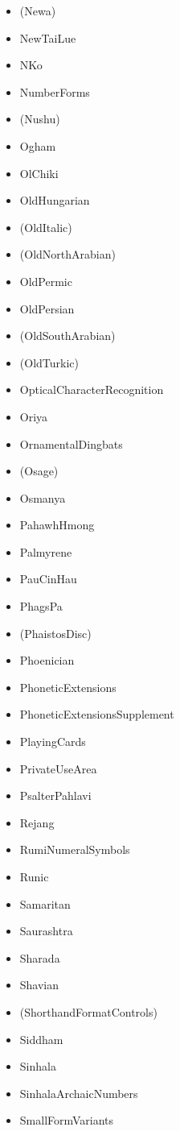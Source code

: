 \documentclass{article}
\newenvironment{itemlist}{%
  \begin{itemize}
	\setlength{\itemsep}{0pt}
	\setlength{\parsep}{0pt}
	\setlength{\topsep}{0pt}
	\setlength{\partopsep}{0pt}
	\setlength{\parskip}{0pt}
	\setlength{\labelsep}{5pt}}%
{
  \end{itemize}}
\begin{document}
\begin{multicols*}{2}
\begin{itemlist}
				\item (Newa)
				\item NewTaiLue
				\item NKo
				\item NumberForms
				\item (Nushu)
				\item Ogham
				\item OlChiki
				\item OldHungarian
				\item (OldItalic)
				\item (OldNorthArabian)
				\item OldPermic
				\item OldPersian
				\item (OldSouthArabian)
				\item (OldTurkic)
				\item OpticalCharacterRecognition
				\item Oriya
				\item OrnamentalDingbats
				\item (Osage)
				\item Osmanya
				\item PahawhHmong
				\item Palmyrene
				\item PauCinHau
				\item PhagsPa
				\item (PhaistosDisc)
				\item Phoenician
				\item PhoneticExtensions
				\item PhoneticExtensionsSupplement
				\item PlayingCards
				\item PrivateUseArea
				\item PsalterPahlavi
				\item Rejang
				\item RumiNumeralSymbols
				\item Runic
				\item Samaritan
				\item Saurashtra
				\item Sharada
				\item Shavian
				\item (ShorthandFormatControls)
				\item Siddham
				\item Sinhala
				\item SinhalaArchaicNumbers
				\item SmallFormVariants

\end{itemlist}
\end{multicols*}
\end{document}
